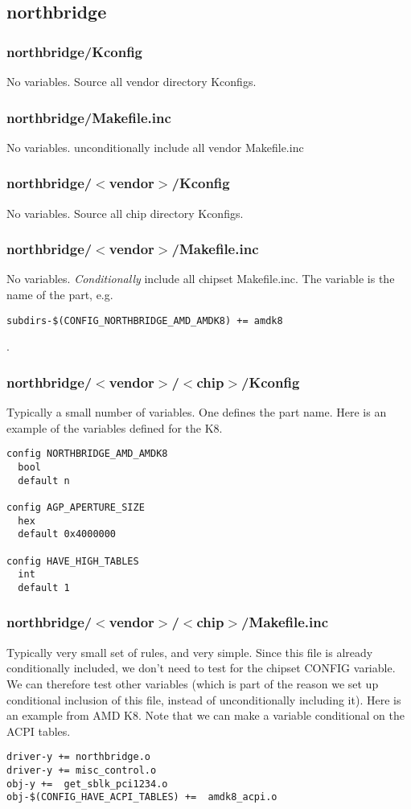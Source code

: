 \documentclass[10pt,letterpaper]{article}
\begin{document}
\subsection{northbridge}
\subsubsection{northbridge/Kconfig}
No variables. Source all vendor directory Kconfigs.
\subsubsection{northbridge/Makefile.inc}
No variables. unconditionally include all vendor Makefile.inc
\subsubsection{northbridge/$<$vendor$>$/Kconfig}
No variables. Source all chip directory Kconfigs.
\subsubsection{northbridge/$<$vendor$>$/Makefile.inc}
No variables. {\em Conditionally} include all chipset Makefile.inc. The variable
is the name of the part, e.g.
\begin{verbatim}
subdirs-$(CONFIG_NORTHBRIDGE_AMD_AMDK8) += amdk8
\end{verbatim}
.
\subsubsection{northbridge/$<$vendor$>$/$<$chip$>$/Kconfig}
Typically a small number of variables. One defines the part name. Here is an example
of the variables defined for the K8.
\begin{verbatim}
config NORTHBRIDGE_AMD_AMDK8
  bool
  default n

config AGP_APERTURE_SIZE
  hex
  default 0x4000000

config HAVE_HIGH_TABLES
  int
  default 1
\end{verbatim}
\subsubsection{northbridge/$<$vendor$>$/$<$chip$>$/Makefile.inc}
Typically very small set of rules, and very simple.
Since this file is already conditionally included,
we don't need to test for the chipset CONFIG variable. We
can therefore test other variables (which is part of the reason
we set up conditional inclusion of this file, instead
of unconditionally including it). Here is an example from AMD K8.
Note that we can make a variable conditional on the ACPI tables.
\begin{verbatim}
driver-y += northbridge.o
driver-y += misc_control.o
obj-y +=  get_sblk_pci1234.o
obj-$(CONFIG_HAVE_ACPI_TABLES) +=  amdk8_acpi.o
\end{verbatim}
\end{document}
